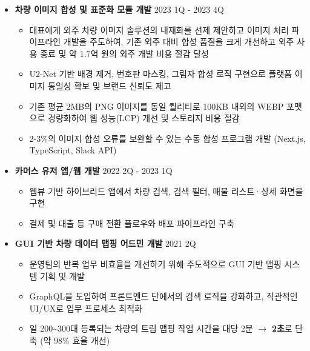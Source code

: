 \documentclass[a4paper, 11pt]{article}
\begin{document}
{\begin{itemize}[leftmargin=*, itemsep=8pt]
        \item \textbf{차량 이미지 합성 및 표준화 모듈 개발} \hfill 2023 1Q - 2023 4Q
        \begin{itemize}[label=$\cdot$, noitemsep]
            \item 대표에게 외주 차량 이미지 솔루션의 내재화를 선제 제안하고 이미지 처리 파이프라인 개발을 주도하여, 기존 외주 대비 합성 품질을 크게 개선하고 외주 사용 종료 및 약 1.7억 원의 외주 개발 비용 절감 달성
            \item U2-Net 기반 배경 제거, 번호판 마스킹, 그림자 합성 로직 구현으로 플랫폼 이미지 통일성 확보 및 브랜드 신뢰도 제고
            \item 기존 평균 2MB의 PNG 이미지를 동일 퀄리티로 100KB 내외의 WEBP 포맷으로 경량화하여 웹 성능(LCP) 개선 및 스토리지 비용 절감
            \item 2-3\%의 이미지 합성 오류를 보완할 수 있는 수동 합성 프로그램 개발 (Next.js, TypeScript, Slack API)
        \end{itemize}

        \item \textbf{카머스 유저 앱/웹 개발} \hfill 2022 2Q - 2023 1Q
        \begin{itemize}[label=$\cdot$, noitemsep]
            \item 웹뷰 기반 하이브리드 앱에서 차량 검색, 검색 필터, 매물 리스트·상세 화면을 구현
            \item 결제 및 대출 등 구매 전환 플로우와 배포 파이프라인 구축
        \end{itemize}
        
        \item \textbf{GUI 기반 차량 데이터 맵핑 어드민 개발} \hfill 2021 2Q
        \begin{itemize}[label=$\cdot$, noitemsep]
            \item 운영팀의 반복 업무 비효율을 개선하기 위해 주도적으로 GUI 기반 맵핑 시스템 기획 및 개발
            \item GraphQL을 도입하여 프론트엔드 단에서의 검색 로직을 강화하고, 직관적인 UI/UX로 업무 프로세스 최적화
            \item 일 200\textasciitilde 300대 등록되는 차량의 트림 맵핑 작업 시간을 대당 2분 $\rightarrow$ \textbf{2초}로 단축 (약 98\% 효율 개선)
        \end{itemize}

    \end{itemize}

    \vspace{5pt}
    
}
\end{document}
